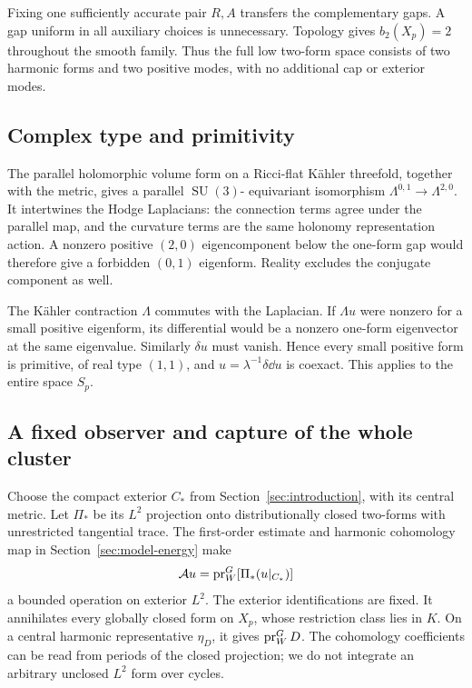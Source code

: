 Fixing one sufficiently accurate pair $R,A$
transfers the complementary gaps. A gap uniform
in all auxiliary choices is unnecessary.
Topology gives $b_2(X_p)=2$ throughout the smooth
family. Thus the full low two-form space consists
of two harmonic forms and two positive modes,
with no additional cap or exterior modes.

\subsection{Complex type and primitivity}

The parallel holomorphic volume form on a
Ricci-flat Kähler threefold, together with the
metric, gives a parallel $\operatorname{SU}(3)$-
equivariant isomorphism
$\Lambda^{0,1}\to\Lambda^{2,0}$.
It intertwines the Hodge Laplacians: the
connection terms agree under the parallel map,
and the curvature terms are the same holonomy
representation action. A nonzero positive
$(2,0)$ eigencomponent below the one-form gap
would therefore give a forbidden $(0,1)$
eigenform. Reality excludes the conjugate
component as well.

The Kähler contraction $\Lambda$ commutes
with the Laplacian. If $\Lambda u$ were
nonzero for a small positive eigenform, its
differential would be a nonzero one-form
eigenvector at the same eigenvalue. Similarly
$\delta u$ must vanish. Hence every small
positive form is primitive, of real type
$(1,1)$, and
$u=\lambda^{-1}\delta\dd u$ is coexact.
This applies to the entire space $S_p$.

\subsection{A fixed observer and capture of the whole cluster}

Choose the compact exterior $C_*$ from
Section~\ref{sec:introduction}, with its
central metric. Let $\Pi_*$ be its $L^2$
projection onto distributionally closed
two-forms with unrestricted tangential trace.
The first-order estimate and harmonic
cohomology map in Section~\ref{sec:model-energy}
make
\begin{equation}\label{eq:actual-fixed-observer}
 \mathcal A u=\operatorname{pr}_W^G[\Pi_*(u|_{C_*})]
\end{equation}
a bounded operation on exterior $L^2$.
The exterior identifications are fixed.
It annihilates every globally closed form
on $X_p$, whose restriction class lies in
$K$. On a central harmonic representative
$\eta_D$, it gives $\operatorname{pr}_W^G D$.
The cohomology coefficients can be read
from periods of the closed projection;
we do not integrate an arbitrary unclosed
$L^2$ form over cycles.

